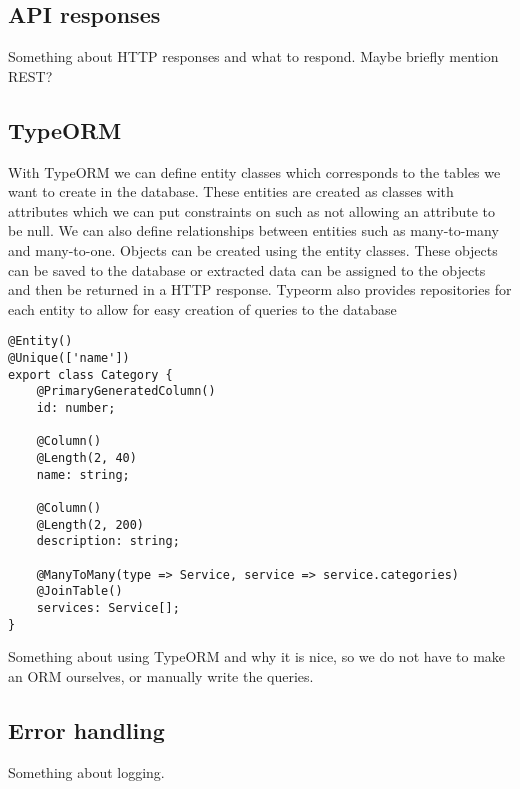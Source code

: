 \subsection{API responses}
Something about HTTP responses and what to respond.
Maybe briefly mention REST?

\subsection{TypeORM}
With TypeORM we can define entity classes which corresponds to the tables we want to create in the database.
These entities are created as classes with attributes which we can put constraints on such as not allowing an attribute to be null. 
We can also define relationships between entities such as many-to-many and many-to-one.
Objects can be created using the entity classes. 
These objects can be saved to the database or extracted data can be assigned to the objects and then be returned in a HTTP response. 
Typeorm also provides repositories for each entity to allow for easy creation of queries to the database


\begin{lstlisting}[caption={The route used for all user related endpoints}, captionpos=b, label={routes-general}]
@Entity()
@Unique(['name'])
export class Category {
	@PrimaryGeneratedColumn()
	id: number;

	@Column()
	@Length(2, 40)
	name: string;

	@Column()
	@Length(2, 200)
	description: string;

	@ManyToMany(type => Service, service => service.categories)
	@JoinTable()
	services: Service[];
}
\end{lstlisting}



Something about using TypeORM and why it is nice, so we do not have to make an ORM ourselves, or manually write the queries.

\subsection{Error handling}
Something about logging.
